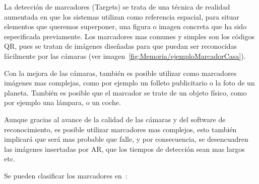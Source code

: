 La detección de marcadores (Targets) se trata de una técnica de realidad aumentada en que los sistemas utilizan como referencia espacial, para situar elementos que queremos superponer, una figura o imagen concreta que ha sido especificada previamente. Los marcadores mas comunes y simples son los códigos QR, pues se tratan de imágenes diseñadas para que puedan ser reconocidas fácilmente por las cámaras (ver imagen~\ref{fig:Memoria/ejemploMarcadorCasa}).


Con la mejora de las cámaras, también es posible utilizar como marcadores imágenes mas complejas, como por ejemplo un folleto publicitario o la foto de un planeta.
También es posible que el marcador se trate de un objeto físico, como por ejemplo una lámpara, o un coche.


Aunque gracias al avance de la calidad de las cámaras y del software de reconocimiento, es posible utilizar marcadores mas complejos, esto también implicará que será mas probable que falle, y por consecuencia, se desencuadren las imágenes insertadas por AR, que los tiempos de detección sean mas largos etc.

Se pueden clasificar los marcadores en~\cite{linowes_babilinski_2017}:



